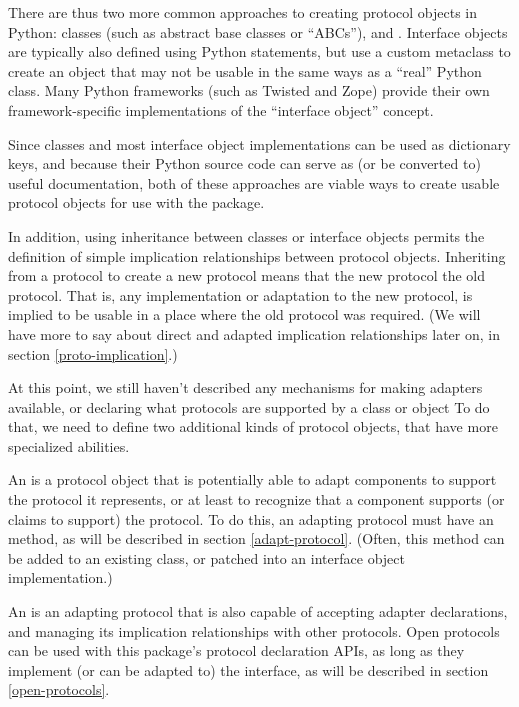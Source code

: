 There are thus two more common approaches to creating protocol objects in
Python: classes (such as abstract base classes or ``ABCs''), and .  Interface objects are typically also defined using Python
 statements, but use a custom metaclass to create an object
that may not be usable in the same ways as a ``real'' Python class.  Many
Python frameworks (such as Twisted and Zope) provide their own
framework-specific implementations of the ``interface object'' concept.

Since classes and most interface object implementations can be used as
dictionary keys, and because their Python source code can serve as (or
be converted to) useful documentation, both of these approaches are viable
ways to create usable protocol objects for use with the 
package.

In addition, using inheritance between classes or interface objects permits
the definition of simple implication relationships between protocol objects.
Inheriting from a protocol to create a new protocol means that the new
protocol  the old protocol.  That is, any implementation
or adaptation to the new protocol, is implied to be usable in a place
where the old protocol was required.  (We will have more to say about direct
and adapted implication relationships later on, in section
\ref{proto-implication}.)

At this point, we still haven't described any mechanisms for making adapters
available, or declaring what protocols are supported by a class or object
To do that, we need to define two additional kinds of protocol objects, that
have more specialized abilities.

An  is a protocol object that is potentially able to
adapt components to support the protocol it represents, or at least to
recognize that a component supports (or claims to support) the protocol.  To
do this, an adapting protocol must have an  method, as
will be described in section \ref{adapt-protocol}.  (Often, this method
can be added to an existing class, or patched into an interface object
implementation.)

An  is an adapting protocol that is also capable of
accepting adapter declarations, and managing its implication relationships
with other protocols.  Open protocols can be used with this package's
protocol declaration APIs, as long as they implement (or can be adapted to)
the  interface, as will be described in section
\ref{open-protocols}.

